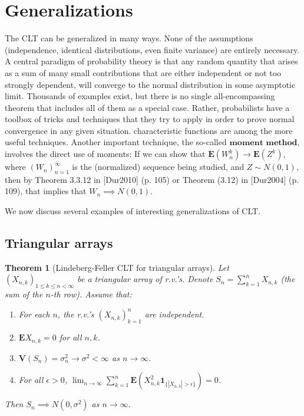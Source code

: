 \documentclass[11pt]{report}
\theoremstyle{plain}
\newtheorem{thm}{Theorem}[chapter]
\theoremstyle{definition}
\begin{document}
\section{Generalizations}
The CLT can be generalized in many ways. None of the
assumptions (independence, identical distributions,
even finite variance) are entirely necessary. A
central paradigm of probability theory is that any
random quantity that arises as a sum of many small
contributions that are either independent or not too
strongly dependent, will converge to the normal
distribution in some asymptotic limit. Thousands of
examples exist, but there is no single
all-encompassing theorem that includes all of them as
a special case. Rather, probabilists have a toolbox of
tricks and techniques that they try to apply in order
to prove normal convergence in any given situation.
characteristic functions are among the more useful
techniques. Another important technique, the so-called
$\textbf{moment method}$, involves the direct use of
moments: If we can show that
$\mathbf{E}(W_n^k)\to \mathbf{E}(Z^k)$, where
$(W_n)_{n=1}^\infty$ is the (normalized) sequence
being studied, and $Z\sim N(0,1)$, then by Theorem
3.3.12 in [Dur2010] (p. 105) or Theorem (3.12) in
[Dur2004] (p. 109), that implies that
$W_n\implies N(0,1)$.

We now discuss several examples of interesting
generalizations of CLT.

\subsection{Triangular arrays}

\begin{thm}[Lindeberg-Feller CLT for triangular arrays]
\label{thm-lindeberg-feller}
Let $(X_{n,k})_{1\le k\le n<\infty}$ be a triangular
array of r.v.'s. Denote $S_n = \sum_{k=1}^n X_{n,k}$
(the sum of the $n$-th row). Assume that:

\begin{enumerate}[label=\arabic*.]
\item For each $n$, the r.v.'s $(X_{n,k})_{k=1}^n$ are
independent.

\item $\mathbf{E} X_{n,k}=0$ for all $n,k$.

\item $\mathbf{V}(S_n) = \sigma_n^2 \to \sigma^2<\infty$ as
$n\to\infty$.

\item For all $\epsilon>0$,
${\displaystyle \lim_{n\to\infty}} \sum_{k=1}^n
\mathbf{E}\left( X_{n,k}^2
\mathbf{1}_{\{|X_{n,k}|>\epsilon\}}\right)=0$.
\end{enumerate}

Then $S_n \implies N(0,\sigma^2)$ as $n\to\infty$.
\end{thm}
\end{document}
